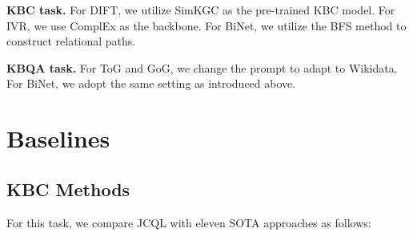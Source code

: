 \noindent\textbf{KBC task.} For DIFT, we utilize SimKGC as the pre-trained KBC model. For IVR, we use ComplEx as the backbone. For BiNet, we utilize the BFS method to construct relational paths. 

\noindent\textbf{KBQA task.} For ToG and GoG, we change the prompt to adapt to Wikidata. For BiNet, we adopt the same setting as introduced above. 



\section{Baselines} \label{appendix:baseline}
\subsection{KBC Methods} \label{appendix:baseline:kbc}
For this task, we compare JCQL with eleven SOTA approaches as follows: 
